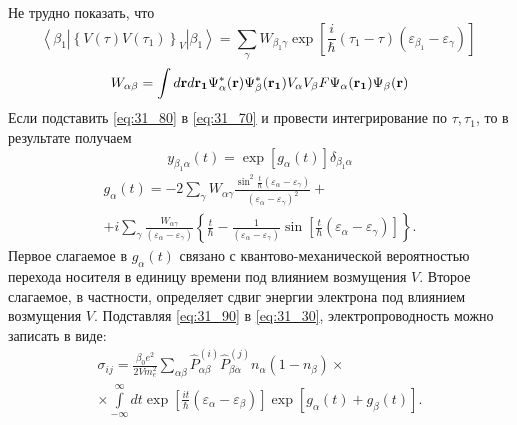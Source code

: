Не трудно показать, что
\begin{equation} \label{eq:31_80}
\left\langle \beta_1 \left| {\left\{V\left(\tau \right)V\left({\tau }_1\right)\right\}}_V\right| \beta_1 \right\rangle =\sum_{\gamma} {W_{\beta_1\gamma} \exp \left[\frac{i}{\hbar} \left(\tau_1-\tau \right) \left(\varepsilon_{\beta_1} - \varepsilon_{\gamma} \right)\right]\ }
\end{equation}
\begin{equation} \label{eq:31_85}
W_{\alpha\beta}=\int{d\boldsymbol{\mathbf{r}} d\boldsymbol{\mathbf{r_1}} \Psi^*_\alpha(\boldsymbol{\mathbf{r}}) \Psi^*_\beta(\boldsymbol{\mathbf{r_1}}) V_\alpha V_\beta F \Psi_\alpha(\boldsymbol{\mathbf{r_1}}) \Psi_\beta(\boldsymbol{\mathbf{r}})}
\end{equation}
Если подставить \eqref{eq:31_80} в \eqref{eq:31_70} и провести интегрирование по $\tau, \tau_1$, то в результате получаем
\begin{equation} \label{eq:31_90}
y_{\beta_1\alpha}(t)= \exp \left[g_{\alpha }\left(t\right)\right] \delta_{\beta_1\alpha}
\end{equation}
\begin{multline} \label{eq:31_100}
g_{\alpha}(t)=-2\sum_{\gamma}{W_{\alpha \gamma }\frac{\sin^2 \frac{t}{\hbar} (\varepsilon_{\alpha} - \varepsilon_{\gamma})}{{(\varepsilon_{\alpha} - \varepsilon_{\gamma})}^2}}+\\
+i\sum_{\gamma }{\frac{W_{\alpha \gamma}}{(\varepsilon_{\alpha} - \varepsilon_{\gamma})}}\left\{\frac{t}{\hbar }-\frac{1}{(\varepsilon_{\alpha} - \varepsilon_{\gamma})}{\sin\left[ \frac{t}{\hbar }(\varepsilon_{\alpha } - \varepsilon_{\gamma})\right] }\right\}.	
\end{multline}
Первое слагаемое в $g_{\alpha}\left(t\right)$ связано с квантово-механической вероятностью перехода носителя в единицу времени под влиянием возмущения $V$. Второе слагаемое, в частности, определяет сдвиг энергии электрона под влиянием возмущения $V$.
Подставляя \eqref{eq:31_90} в \eqref{eq:31_30}, электропроводность можно записать в виде:
\begin{multline} \label{eq:31_110}
\sigma_{ij}=\frac{\beta_0 e^2}{2V m^2_e}\sum_{\alpha\beta } {{\hat{P}}^{(i)}_{\alpha\beta} {\hat{P}}^{(j)}_{\beta\alpha} n_{\alpha} \left(1-n_{\beta}\right)} \times\\
\times \int\limits_{-\infty }^\infty {dt \exp{ \left[\frac{it}{\hbar} \left( \varepsilon_{\alpha } - \varepsilon_{\beta} \right) \right] }  \exp{ \left[ g_{\alpha }(t)+g_{\beta }(t)\right]} }.
\end{multline} 

